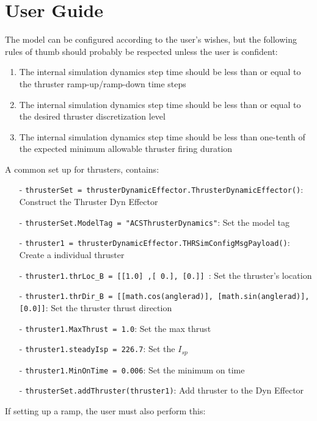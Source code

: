 \section{User Guide}

The model can be configured according to the user's wishes, but the following 
rules of thumb should probably be respected unless the user is confident:
\begin{enumerate}
\item{The internal simulation dynamics step time should be less than or equal 
     to the thruster ramp-up/ramp-down time steps}
\item{The internal simulation dynamics step time should be less than or equal to 
     the desired thruster discretization level}
\item{The internal simulation dynamics step time should be less than one-tenth 
    of the expected minimum allowable thruster firing duration}
\end{enumerate}

A common set up for thrusters, contains:

\begin{itemize}
 \item[-]      \texttt{thrusterSet = thrusterDynamicEffector.ThrusterDynamicEffector()}: Construct the Thruster Dyn Effector
  \item[-]   \texttt{thrusterSet.ModelTag = "ACSThrusterDynamics"}: Set the model tag
   \item[-]    \texttt{thruster1 = thrusterDynamicEffector.THRSimConfigMsgPayload()}: Create a individual thruster
    \item[-] \texttt{thruster1.thrLoc\_B = [[1.0] ,[ 0.], [0.]] }: Set the thruster's location
   \item[-]  \texttt{thruster1.thrDir\_B = [[math.cos(anglerad)], [math.sin(anglerad)], [0.0]]}: Set the thruster thrust direction
  \item[-]   \texttt{thruster1.MaxThrust = 1.0}: Set the max thrust
  \item[-]    \texttt{thruster1.steadyIsp = 226.7}: Set the $I_{sp}$
  \item[-]   \texttt{thruster1.MinOnTime = 0.006}: Set the minimum on time
   \item[-]   \texttt{thrusterSet.addThruster(thruster1)}: Add thruster to the Dyn Effector
\end{itemize}

If setting up a ramp, the user must also perform this:

